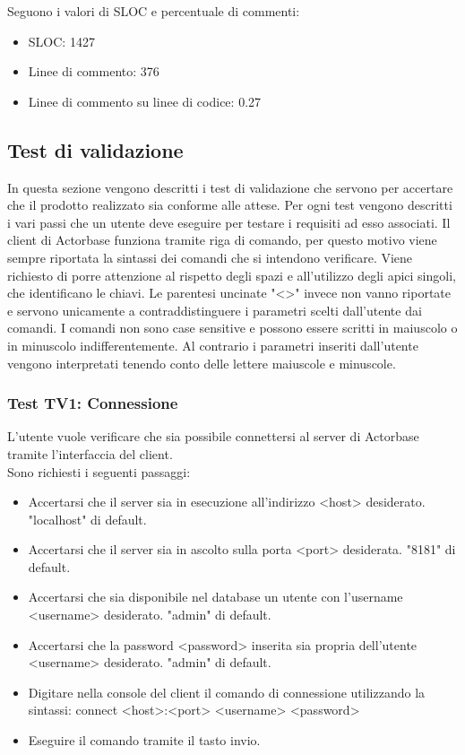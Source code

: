 \documentclass[a4paper]{article}
\begin{document}
		
		Seguono i valori di SLOC e percentuale di commenti:
		\begin{itemize}
			\item SLOC: 1427
			\item Linee di commento: 376
			\item Linee di commento su linee di codice: 0.27
		\end{itemize}
			



	\subsection{Test di validazione}
		In questa sezione vengono descritti i test di validazione che servono per accertare che il prodotto realizzato sia conforme alle attese. 
		Per ogni test vengono descritti i vari passi che un utente deve eseguire per testare i requisiti ad esso associati.
		Il client di Actorbase funziona tramite riga di comando, per questo motivo viene sempre riportata la sintassi dei comandi che si intendono verificare.
		Viene richiesto di porre attenzione al rispetto degli spazi e all'utilizzo degli apici singoli, che identificano le chiavi.
		Le parentesi uncinate "<>" invece non vanno riportate e servono unicamente a contraddistinguere i parametri scelti dall'utente dai comandi.
		I comandi non sono case sensitive e possono essere scritti in maiuscolo o in minuscolo indifferentemente. 
		Al contrario i parametri inseriti dall'utente vengono interpretati tenendo conto delle lettere maiuscole e minuscole.
		
		\subsubsection{Test TV1: Connessione}
		L'utente vuole verificare che sia possibile connettersi al server di Actorbase tramite l'interfaccia del client. \\
		Sono richiesti i seguenti passaggi:
		\begin{itemize}
			\item Accertarsi che il server sia in esecuzione all'indirizzo <host> desiderato. "localhost" di default.
			\item Accertarsi che il server sia in ascolto sulla porta <port> desiderata. "8181" di default.
			\item Accertarsi che sia disponibile nel database un utente con l'username <username> desiderato. "admin" di default.
			\item Accertarsi che la password <password> inserita sia propria dell'utente <username> desiderato. "admin" di default.
			\item Digitare nella console del client il comando di connessione utilizzando la sintassi: connect <host>:<port> <username> <password>
			\item Eseguire il comando tramite il tasto invio.
		\end{itemize}
		
\end{document}
